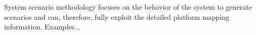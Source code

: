 System scenario methodology focuses on the behavior of the system to generate scenarios and can, therefore, fully exploit the detailed platform mapping information. 
Examples...


